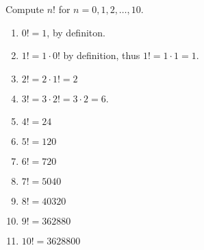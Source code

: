 \guard




\begin{exmp}
\label{exmp:computeFactorials}
  Compute $n!$ for $n=0,1,2,\dots,10$.
  \begin{enumerate}
    \item $0!=1$, by definiton.
    \item $1! = 1\cdot 0 !$ by definition, thus $1!= 1\cdot 1 = 1$.
    \item $2! = 2\cdot 1!= 2$
    \item $3! = 3\cdot 2! = 3\cdot 2 = 6$.
    \item $4! = 24$
    \item $5! = 120$
    \item $6! = 720$
    \item $7! = 5040$
    \item $8! = 40320$
    \item $9! = 362880$
    \item $10!= 3628800$
  \end{enumerate}
\end{exmp}
